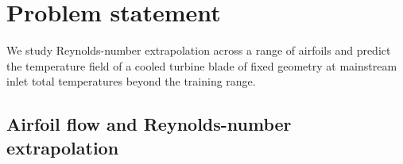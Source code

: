 \documentclass[a4paper,fleqn]{cas-sc}
\begin{document}







\section{Problem statement}\label{sec:problem-statement}
\par

We study Reynolds-number extrapolation across a range of airfoils and predict
the temperature field of a cooled turbine blade of fixed geometry at mainstream
inlet total temperatures beyond the training range.

\subsection{Airfoil flow and Reynolds-number extrapolation}\label{subsec:airfoil-problem}
\par
\end{document}

